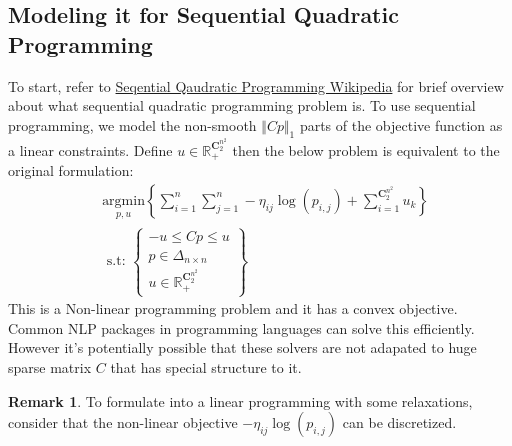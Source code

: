 \documentclass[11pt]{article}
\theoremstyle{definition}
\newtheorem{remark}{Remark}[subsection]
{
    \newtheorem{assumption}{Assumption}
}
\numberwithin{equation}{subsection}
\begin{document}
    \subsection{Modeling it for Sequential Quadratic Programming}\label{sec:sqp_formulation}
        To start, refer to \href{https://en.wikipedia.org/wiki/Sequential_quadratic_programming}{Seqential Qaudratic Programming Wikipedia} for brief overview about what sequential quadratic programming problem is. 
        To use sequential programming, we model the non-smooth $\Vert Cp\Vert_1$ parts of the objective function as a linear constraints. 
        Define $u\in \mathbb R^{\mathbf C^{n^2}_2}_+$ then the below problem is equivalent to the original formulation:
        \begin{align}
            &\underset{
                \substack{
                        p, u
                    }
            }{\text{argmin}} 
            \left\lbrace
                \sum_{i = 1}^{n}\sum_{j = 1}^{n}
                    -\eta_{ij}\log(p_{i, j})
                + 
                \sum_{i = 1}^{\mathbf C_2^{n^2}} u_k
            \right\rbrace
            \\
            &\text{ s.t: }
            \left\lbrace
            \begin{aligned}
                - u \le Cp \le u
                \\
                p \in \Delta_{n\times n}
                \\ 
                u \in \mathbb R^{\mathbf C^{n^2}_2}_+
            \end{aligned}
            \right\rbrace
        \end{align}
        This is a Non-linear programming problem and it has a convex objective. 
        Common NLP packages in programming languages can solve this efficiently. 
        However it's potentially possible that these solvers are not adapated to huge sparse matrix $C$ that has special structure to it. 
        \begin{remark}
            To formulate into a linear programming with some relaxations, consider that the non-linear objective $-\eta_{ij}\log(p_{i,j})$ can be discretized. 
        \end{remark}
\end{document}
